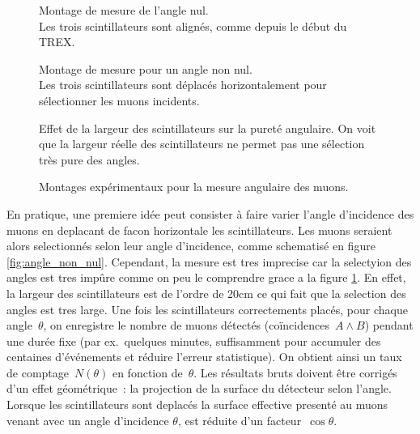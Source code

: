 \documentclass[a4paper,12pt,twoside]{article}
\begin{document}
\begin{figure}[H]
  \begin{minipage}{0.3\textwidth}
    \centering
    
    \caption{Montage de mesure de l'angle nul.\\Les trois scintillateurs sont alignés, comme depuis le début du TREX.}
    \label{fig:angle_nul}
  \end{minipage}
  \hfill
  \begin{minipage}
  {0.3\textwidth}
    \centering
    
    \caption{Montage de mesure pour un angle non nul.\\Les trois scintillateurs sont déplacés horizontalement pour sélectionner les muons incidents.}
    \label{fig:angle_non_nul}
  \end{minipage}
  \hfill
  \begin{minipage}{0.3\textwidth}
    \centering
    
    \caption{Effet de la largeur des scintillateurs sur la pureté angulaire. On voit que la largeur réelle des scintillateurs ne permet pas une sélection très pure des angles.}
    \label{fig:range_des_angles}
  \end{minipage}
  \caption{Montages expérimentaux pour la mesure angulaire des muons.}
\end{figure}


En pratique, une premiere idée peut consister à faire varier l'angle d'incidence des muons en deplacant de facon horizontale les scintillateurs. Les muons seraient alors selectionnés selon leur angle d'incidence, comme schematisé en figure \ref{fig:angle_non_nul}. Cependant, la mesure est tres imprecise car la selectyion des angles est tres impûre comme on peu le comprendre grace a la figure \ref{fig:range_des_angles}. En effet, la largeur des scintillateurs est de l'ordre de 20cm ce qui fait que la selection des angles est tres large.
Une fois les scintillateurs correctements placés, pour chaque angle~$\theta$, on enregistre le nombre de muons détectés (coïncidences $A\wedge B$) pendant une durée fixe (par ex.\ quelques minutes, suffisamment pour accumuler des centaines d’événements et réduire l’erreur statistique). On obtient ainsi un taux de comptage~$N(\theta)$ en fonction de~$\theta$. Les résultats bruts doivent être corrigés d'un effet géométrique~: la projection de la surface du détecteur selon l'angle. Lorsque les scintillateurs sont deplacés la surface effective presenté au muons venant avec un angle d'incidence $\theta$, est réduite d'un facteur~$\cos\theta$. 
\end{document}
